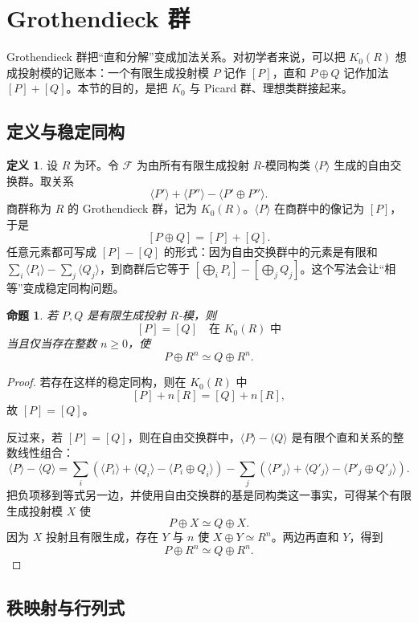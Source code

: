 \documentclass[11pt,a4paper,openany]{ctexbook}
\numberwithin{equation}{chapter}
\theoremstyle{plain}
\newtheorem{proposition}[theorem]{命题}
\theoremstyle{definition}
\newtheorem{definition}[theorem]{定义}
\theoremstyle{remark}
\begin{document}
\section{Grothendieck 群}

Grothendieck 群把“直和分解”变成加法关系。对初学者来说，可以把 $K_0(R)$ 想成投射模的记账本：一个有限生成投射模 $P$ 记作 $[P]$，直和 $P\oplus Q$ 记作加法 $[P]+[Q]$。本节的目的，是把 $K_0$ 与 Picard 群、理想类群接起来。

\subsection{定义与稳定同构}

\begin{definition}
设 $R$ 为环。令 $\mathcal F$ 为由所有有限生成投射 $R$-模同构类 $\langle P\rangle$ 生成的自由交换群。取关系
\[
\langle P'\rangle+\langle P''\rangle-\langle P'\oplus P''\rangle.
\]
商群称为 $R$ 的 Grothendieck 群，记为 $K_0(R)$。$\langle P\rangle$ 在商群中的像记为 $[P]$，于是
\[
[P\oplus Q]=[P]+[Q].
\]
任意元素都可写成 $[P]-[Q]$ 的形式：因为自由交换群中的元素是有限和
$\sum_i\langle P_i\rangle-\sum_j\langle Q_j\rangle$，到商群后它等于
$[\bigoplus_iP_i]-[\bigoplus_jQ_j]$。这个写法会让“相等”变成稳定同构问题。
\end{definition}

\begin{proposition}
若 $P,Q$ 是有限生成投射 $R$-模，则
\[
[P]=[Q]\quad\text{在 }K_0(R)\text{ 中}
\]
当且仅当存在整数 $n\ge0$，使
\[
P\oplus R^n\simeq Q\oplus R^n.
\]
\end{proposition}

\begin{proof}
若存在这样的稳定同构，则在 $K_0(R)$ 中
\[
[P]+n[R]=[Q]+n[R],
\]
故 $[P]=[Q]$。

反过来，若 $[P]=[Q]$，则在自由交换群中，$\langle P\rangle-\langle Q\rangle$ 是有限个直和关系的整数线性组合：
\[
\langle P\rangle-\langle Q\rangle
=\sum_i(\langle P_i\rangle+\langle Q_i\rangle-\langle P_i\oplus Q_i\rangle)
-\sum_j(\langle P'_j\rangle+\langle Q'_j\rangle-\langle P'_j\oplus Q'_j\rangle).
\]
把负项移到等式另一边，并使用自由交换群的基是同构类这一事实，可得某个有限生成投射模
$X$ 使
\[
P\oplus X\simeq Q\oplus X.
\]
因为 $X$ 投射且有限生成，存在 $Y$ 与 $n$ 使 $X\oplus Y\simeq R^n$。两边再直和 $Y$，得到
\[
P\oplus R^n\simeq Q\oplus R^n.
\]
\end{proof}

\subsection{秩映射与行列式}
\end{document}
